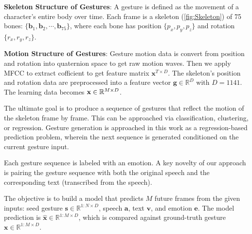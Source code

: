 \textbf{Skeleton Structure of Gestures}: A gesture is defined as the movement of a character's entire body over time.
Each frame is a skeleton (\autoref{fig:Skeleton}) of 75 bones: $\{ \mathbf{b}_{1}, \mathbf{b}_{2}, \cdots , \mathbf{b}_{75} \}$, where each bone has position $\{ p_{x}, p_{y}, p_{z} \}$ and rotation $\{ r_{x}, r_{y}, r_{z} \}$.



\textbf{Motion Structure of Gestures}: Gesture motion data is convert from position and rotation into quaternion space to get raw motion waves. Then we apply MFCC to extract cofficient \citep{suwajanakorn2017synthesizing} to get feature matrix $\mathbf{x}^{T \times D}$.
The skeleton's position and rotation data are preprocessed into a feature vector $\mathbf{g} \in \mathbb{R}^{D}$ with $D = 1141$. The learning data becomes $\mathbf{x} \in \mathbb{R}^{M \times D}$.



The ultimate goal is to produce a sequence of gestures that reflect the motion of the skeleton frame by frame. This can be approached via classification, clustering, or regression. Gesture generation is approached in this work as a regression-based prediction problem, wherein the next sequence is generated conditioned on the current gesture input.


Each gesture sequence is labeled with an emotion. A key novelty of our approach is pairing the gesture sequence with both the original speech and the corresponding text (transcribed from the speech).

The objective is to build a model that predicts $M$ future frames from the given inputs: seed gesture $\mathbf{s} \in \mathbb{R}^{1:N \times D}$, speech $\mathbf{a}$, text $\mathbf{v}$, and emotion $\mathbf{e}$. The model prediction is $\hat{\mathbf{x}} \in \mathbb{R}^{1:M \times D}$, which is compared against ground-truth gesture $\mathbf{x} \in \mathbb{R}^{1:M \times D}$.

